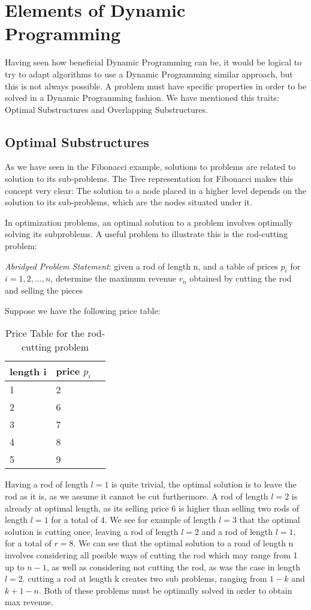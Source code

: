 \section{Elements of Dynamic Programming}

Having seen how beneficial Dynamic Programming can be, it would be logical to
try to adapt algorithms to use a Dynamic Programming similar approach, but this is not always possible.
A problem must have specific properties in order to be solved in a Dynamic Programming fashion. We have
mentioned this traits: Optimal Substructures and Overlapping Substructures.

\subsection{Optimal Substructures}

As we have seen in the Fibonacci example, solutions to problems are 
related to solution to its sub-problems. The Tree representation for Fibonacci 
makes this concept very clear: The solution to a node placed in a higher 
level depends on the solution to its sub-problems, which are the nodes situated under it.

In optimization problems, an optimal solution to a problem involves optimally
solving its subproblems. A useful problem to illustrate this is the rod-cutting problem:

\indent \emph{Abridged Problem Statement}: given a rod of length n, and a table of prices $p_i$ for $i = 1, 2, ..., n$,
determine the maximum revenue $r_n$ obtained by cutting the rod and selling the pieces \cite{cormen2009introduction}

Suppose we have the following price table:
\begin{table}[ht]
\centering
\begin{tabular}{l|ll}
  \textbf{length i}&\textbf{price $p_i$}\\\hline
  1 & 2\\
  2 & 6\\
  3 & 7\\
  4 & 8\\
  5 & 9
\end{tabular}
\caption{Price Table for the rod-cutting problem}
\label{fig:priceforrods}
\end{table}

Having a rod of length $l = 1$ is quite trivial, the optimal solution is to leave the rod as it is, as we 
assume it cannot be cut furthermore. A rod of length $l = 2$ is already at optimal length,
as its selling price 6 is higher than selling two rods of length $l = 1$ for a total of 4.
We see for example of length $l = 3$ that the optimal solution is cutting once, leaving
a rod of length $l = 2$ and a rod of length $l = 1$, for a total of $r = 8$. We can see that the optimal
solution to a road of length n involves considering  all posible ways of cutting the rod which
may range from 1 up to $n - 1$, as well as considering not cutting the rod, as was the case in length
$l = 2$. cutting a rod at length k creates two sub problems, ranging from 
$1 - k$ and $k+1 - n$. Both of these problems must be optimally solved in order to obtain max revenue.

